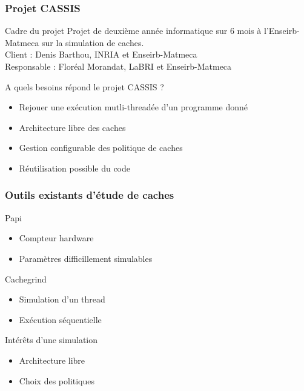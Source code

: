 \begin{frame}
  \frametitle{Projet CASSIS}
  \begin{block}{Cadre du projet}
    Projet de deuxième année informatique sur 6 mois à l'Enseirb-Matmeca sur la simulation de caches.\\
    Client : Denis Barthou, INRIA et Enseirb-Matmeca\\
    Responsable : Floréal Morandat, LaBRI et Enseirb-Matmeca
  \end{block}
  \begin{block}{A quels besoins répond le projet CASSIS ?}
  \begin{itemize}  
  \item Rejouer une exécution mutli-threadée d'un programme donné
  \item Architecture libre des caches
  \item Gestion configurable des politique de caches 
  \item Réutilisation possible du code
  \end{itemize}
  \end{block}
\end{frame}

\begin{frame}
  \frametitle{Outils existants d'étude de caches}
  \begin{block}{Papi}
  \begin{itemize}
    \item Compteur hardware
    \item Paramètres difficillement simulables
    \end{itemize}    
  \end{block}
  \begin{block}{Cachegrind}
    \begin{itemize}
    \item Simulation d'un thread
    \item Exécution séquentielle
    \end{itemize}
  \end{block}   

  \begin{block}{Intérêts d'une simulation}
    \begin{itemize}
        \item Architecture libre
        \item Choix des politiques
    \end{itemize}
  \end{block}
\end{frame}



